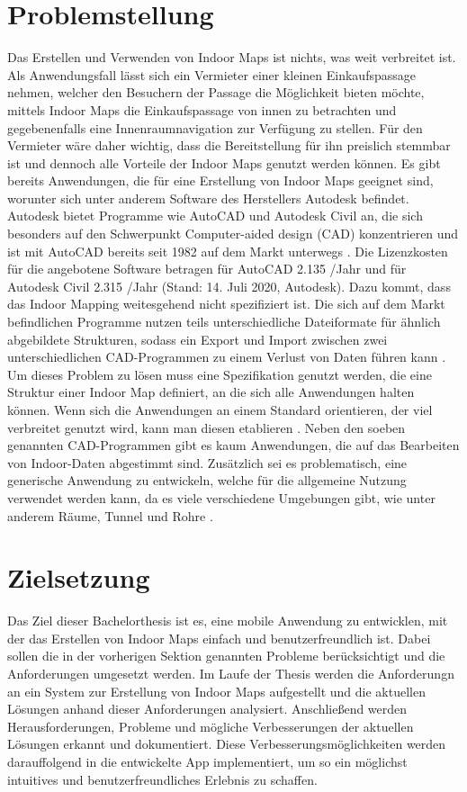 \section{Problemstellung}
\label{sec:problems}
Das Erstellen und Verwenden von Indoor Maps ist nichts, was weit verbreitet ist.
Als Anwendungsfall lässt sich ein Vermieter einer kleinen Einkaufspassage nehmen, welcher den Besuchern der Passage die Möglichkeit bieten möchte, mittels Indoor Maps die Einkaufspassage von innen zu betrachten und gegebenenfalls eine Innenraumnavigation zur Verfügung zu stellen.
Für den Vermieter wäre daher wichtig, dass die Bereitstellung für ihn preislich stemmbar ist und dennoch alle Vorteile der Indoor Maps genutzt werden können.\pbreak%
%
Es gibt bereits Anwendungen, die für eine Erstellung von Indoor Maps geeignet sind, worunter sich unter anderem Software des Herstellers Autodesk befindet.
Autodesk bietet Programme wie AutoCAD und Autodesk Civil an, die sich besonders auf den Schwerpunkt Computer-aided design (CAD) konzentrieren und ist mit AutoCAD bereits seit 1982 auf dem Markt unterwegs \parencite{HUR2008}.
Die Lizenzkosten für die angebotene Software betragen für AutoCAD 2.135 /Jahr und für Autodesk Civil 2.315 /Jahr (Stand: 14. Juli 2020, Autodesk).\pbreak%
%
Dazu kommt, dass das Indoor Mapping weitesgehend nicht spezifiziert ist.
Die sich auf dem Markt befindlichen Programme nutzen teils unterschiedliche Dateiformate für ähnlich abgebildete Strukturen, sodass ein Export und Import zwischen zwei unterschiedlichen CAD-Programmen zu einem Verlust von Daten führen kann \parencite[65]{GEL2019, ZLA2013}.
Um dieses Problem zu lösen muss eine Spezifikation genutzt werden, die eine Struktur einer Indoor Map definiert, an die sich alle Anwendungen halten können.
Wenn sich die Anwendungen an einem Standard orientieren, der viel verbreitet genutzt wird, kann man diesen etablieren \parencite{GEL2019}.\pbreak%
%
Neben den soeben genannten CAD-Programmen gibt es kaum Anwendungen, die auf das Bearbeiten von Indoor-Daten abgestimmt sind.
Zusätzlich sei es problematisch, eine generische Anwendung zu entwickeln, welche für die allgemeine Nutzung verwendet werden kann, da es viele verschiedene Umgebungen gibt, wie unter anderem Räume, Tunnel und Rohre \parencite[65]{ZLA2013}.

\section{Zielsetzung}
Das Ziel dieser Bachelorthesis ist es, eine mobile Anwendung zu entwicklen, mit der das Erstellen von Indoor Maps einfach und benutzerfreundlich ist.
Dabei sollen die in der vorherigen Sektion genannten Probleme berücksichtigt und die Anforderungen umgesetzt werden.
Im Laufe der Thesis werden die Anforderungn an ein System zur Erstellung von Indoor Maps aufgestellt und die aktuellen Lösungen anhand dieser Anforderungen analysiert.
Anschließend werden Herausforderungen, Probleme und mögliche Verbesserungen der aktuellen Lösungen erkannt und dokumentiert.
Diese Verbesserungsmöglichkeiten werden darauffolgend in die entwickelte App implementiert, um so ein möglichst intuitives und benutzerfreundliches Erlebnis zu schaffen.
